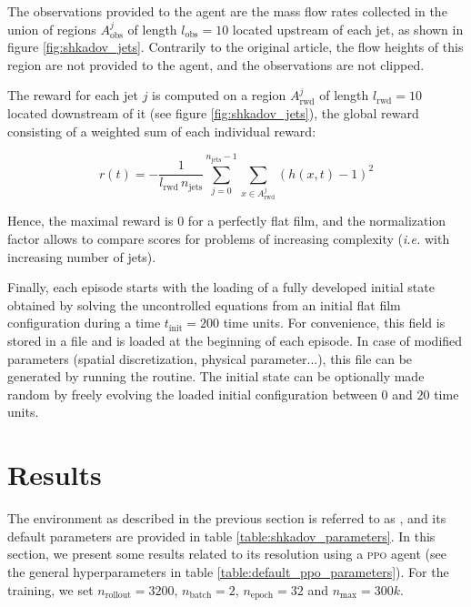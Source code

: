 The observations provided to the agent are the mass flow rates collected in the union of regions $A^j_\text{obs}$ of length $l_\text{obs} = 10$ located upstream of each jet, as shown in figure \ref{fig:shkadov_jets}. Contrarily to the original article, the flow heights of this region are not provided to the agent, and the observations are not clipped.

The reward for each jet $j$ is computed on a region $A^j_\text{rwd}$ of length $l_\text{rwd} = 10$ located downstream of it (see figure \ref{fig:shkadov_jets}), the global reward consisting of a weighted sum of each individual reward:

\begin{equation}
\label{eq:shkadov_reward}
	r(t) = - \frac{1}{l_\text{rwd} \, n_\text{jets}} \sum_{j=0}^{n_\text{jets}-1} \sum_{x \in A^j_\text{rwd}} (h(x,t) - 1)^2
\end{equation}

Hence, the maximal reward is $0$ for a perfectly flat film, and the normalization factor allows to compare scores for problems of increasing complexity (\textit{i.e.} with increasing number of jets).

Finally, each episode starts with the loading of a fully developed initial state obtained by solving the uncontrolled equations from an initial flat film configuration during a time $t_\text{init} = 200$ time units. For convenience, this field is stored in a file and is loaded at the beginning of each episode. In case of modified parameters (spatial discretization, physical parameter...), this file can be generated by running the  routine. The initial state can be optionally made random by freely evolving the loaded initial configuration between $0$ and $20$ time units.

\section{Results}

The environment as described in the previous section is referred to as , and its default parameters are provided in table \ref{table:shkadov_parameters}. In this section, we present some results related to its resolution using a \textsc{ppo} agent (see the general hyperparameters in table \ref{table:default_ppo_parameters}). For the training, we set $n_\text{rollout} = 3200$, $n_\text{batch} = 2$, $n_\text{epoch} = 32$ and $n_\text{max} = 300k$.

